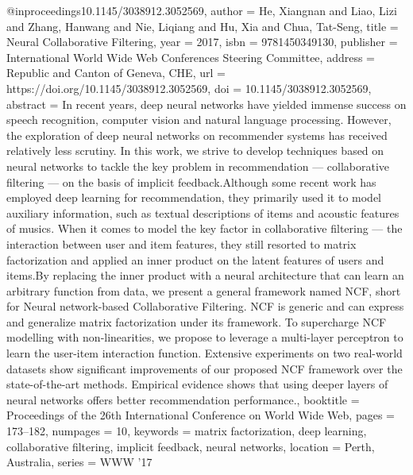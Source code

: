 @inproceedings{10.1145/3038912.3052569,
author = {He, Xiangnan and Liao, Lizi and Zhang, Hanwang and Nie, Liqiang and Hu, Xia and Chua, Tat-Seng},
title = {Neural Collaborative Filtering},
year = {2017},
isbn = {9781450349130},
publisher = {International World Wide Web Conferences Steering Committee},
address = {Republic and Canton of Geneva, CHE},
url = {https://doi.org/10.1145/3038912.3052569},
doi = {10.1145/3038912.3052569},
abstract = {In recent years, deep neural networks have yielded immense success on speech recognition, computer vision and natural language processing. However, the exploration of deep neural networks on recommender systems has received relatively less scrutiny. In this work, we strive to develop techniques based on neural networks to tackle the key problem in recommendation --- collaborative filtering --- on the basis of implicit feedback.Although some recent work has employed deep learning for recommendation, they primarily used it to model auxiliary information, such as textual descriptions of items and acoustic features of musics. When it comes to model the key factor in collaborative filtering --- the interaction between user and item features, they still resorted to matrix factorization and applied an inner product on the latent features of users and items.By replacing the inner product with a neural architecture that can learn an arbitrary function from data, we present a general framework named NCF, short for Neural network-based Collaborative Filtering. NCF is generic and can express and generalize matrix factorization under its framework. To supercharge NCF modelling with non-linearities, we propose to leverage a multi-layer perceptron to learn the user-item interaction function. Extensive experiments on two real-world datasets show significant improvements of our proposed NCF framework over the state-of-the-art methods. Empirical evidence shows that using deeper layers of neural networks offers better recommendation performance.},
booktitle = {Proceedings of the 26th International Conference on World Wide Web},
pages = {173–182},
numpages = {10},
keywords = {matrix factorization, deep learning, collaborative filtering, implicit feedback, neural networks},
location = {Perth, Australia},
series = {WWW '17}
}

